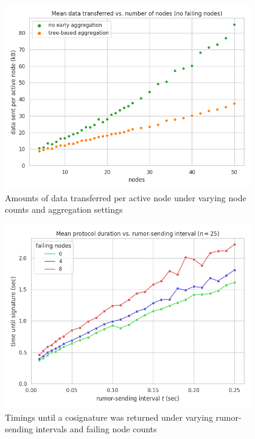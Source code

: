 \begin{figure}[!htbp]
    \centering
    \includegraphics[width=0.95\textwidth]{figures/4/bandwidth_tx_sum_by_mode_big.png}
    \caption{Amounts of data transferred per active node under varying node counts and aggregation settings}
    \label{fig4data}
\end{figure}

\begin{figure}[!htbp]
    \centering
    \includegraphics[width=0.95\textwidth]{figures/6/round_wall_sum_by_gossip_tick.png}
    \caption{Timings until a cosignature was returned under varying rumor-sending intervals and failing node counts}
    \label{fig6time}
\end{figure}

